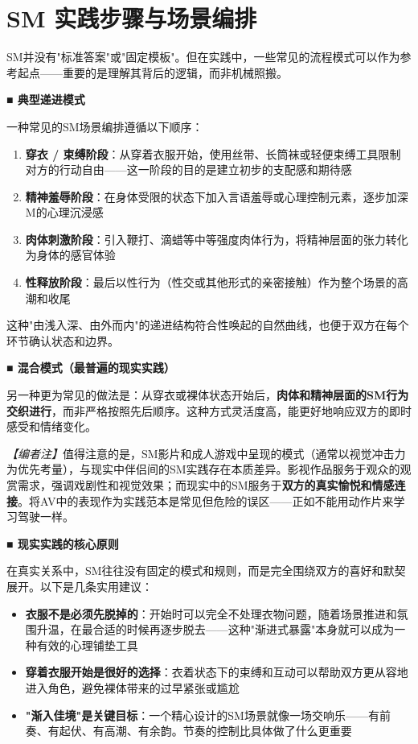 \documentclass[12pt,UTF8]{ctexbook}
\begin{document}
\section{SM 实践步骤与场景编排}

SM并没有"标准答案"或"固定模板"。但在实践中，一些常见的流程模式可以作为参考起点——重要的是理解其背后的逻辑，而非机械照搬。

\noindent\textbf{■ 典型递进模式}

一种常见的SM场景编排遵循以下顺序：

\begin{enumerate}
	\item \textbf{穿衣 / 束缚阶段}：从穿着衣服开始，使用丝带、长筒袜或轻便束缚工具限制对方的行动自由——这一阶段的目的是建立初步的支配感和期待感
	\item \textbf{精神羞辱阶段}：在身体受限的状态下加入言语羞辱或心理控制元素，逐步加深M的心理沉浸感
	\item \textbf{肉体刺激阶段}：引入鞭打、滴蜡等中等强度肉体行为，将精神层面的张力转化为身体的感官体验
	\item \textbf{性释放阶段}：最后以性行为（性交或其他形式的亲密接触）作为整个场景的高潮和收尾
\end{enumerate}

这种"由浅入深、由外而内"的递进结构符合性唤起的自然曲线，也便于双方在每个环节确认状态和边界。

\noindent\textbf{■ 混合模式（最普遍的现实实践）}

另一种更为常见的做法是：从穿衣或裸体状态开始后，\textbf{肉体和精神层面的SM行为交织进行}，而非严格按照先后顺序。这种方式灵活度高，能更好地响应双方的即时感受和情绪变化。

\textit{【编者注】}值得注意的是，SM影片和成人游戏中呈现的模式（通常以视觉冲击力为优先考量），与现实中伴侣间的SM实践存在本质差异。影视作品服务于观众的观赏需求，强调戏剧性和视觉效果；而现实中的SM服务于\textbf{双方的真实愉悦和情感连接}。将AV中的表现作为实践范本是常见但危险的误区——正如不能用动作片来学习驾驶一样。

\noindent\textbf{■ 现实实践的核心原则}

在真实关系中，SM往往没有固定的模式和规则，而是完全围绕双方的喜好和默契展开。以下是几条实用建议：

\begin{itemize}
	\item \textbf{衣服不是必须先脱掉的}：开始时可以完全不处理衣物问题，随着场景推进和氛围升温，在最合适的时候再逐步脱去——这种"渐进式暴露"本身就可以成为一种有效的心理铺垫工具
	\item \textbf{穿着衣服开始是很好的选择}：衣着状态下的束缚和互动可以帮助双方更从容地进入角色，避免裸体带来的过早紧张或尴尬
	\item \textbf{"渐入佳境"是关键目标}：一个精心设计的SM场景就像一场交响乐——有前奏、有起伏、有高潮、有余韵。节奏的控制比具体做了什么更重要
\end{itemize}
\end{document}
